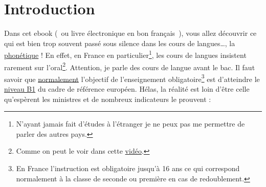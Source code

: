\chapter{Introduction}\label{chap:intro}
\minitoc

Dans cet ebook (~ou livre électronique en bon français~), vous allez
découvrir ce qui est bien trop souvent passé sous silence dans les
cours de langues\ldots{}, la \underline{phonétique} ! En effet, en France en
particulier\footnote{N'ayant jamais fait d'études à l'étranger je ne
  peux pas me permettre de parler des autres pays.}, les cours de
langues insistent rarement sur l'oral\footnote{Comme on peut le voir dans cette \href{http://doyouspeakenglish.fr/les-francais-savent-ils-parler-anglais/}{vidéo}.}. Attention, je parle des cours
de langue avant le bac. Il faut savoir que \underline{normalement}
l'objectif de l'enseignement obligatoire\footnote{En France
  l'instruction est obligatoire jusqu'à 16 ans ce qui correspond
  normalement à la classe de seconde ou première en cas de
  redoublement.} est d'atteindre le
\href{http://doyouspeakenglish.fr/quel-niveau-danglais-avez-vous/}{niveau
  B1} du cadre de référence européen. Hélas, la réalité est
loin d'être celle qu'espèrent les ministres et de nombreux indicateurs le prouvent :
